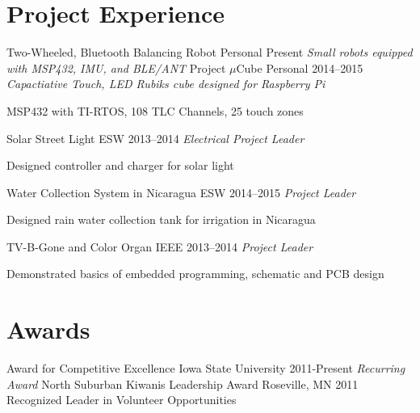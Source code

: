 \documentclass[]{friggeri-cv} %
\begin{document}
\section{Project Experience}
\begin{entrylist}
\entry
{Two-Wheeled, Bluetooth Balancing Robot}
{Personal}
{Present}
{\emph{Small robots equipped with MSP432, IMU, and BLE/ANT}}
{}
\entry
{Project \textbf{$\mu$}Cube}
{Personal}
{2014--2015}
{\emph{Capactiative Touch, LED Rubiks cube designed for Raspberry Pi}}
{\begin{itemizenosep}
	\item MSP432 with TI-RTOS, 108 TLC Channels, 25 touch zones
\end{itemizenosep}}
\entry
{Solar Street Light}
{ESW}
{2013--2014}
{\emph{Electrical Project Leader}}
{\begin{itemizenosep}
	\item Designed controller and charger for solar light
\end{itemizenosep}}
\entry
{Water Collection System in Nicaragua}
{ESW}
{2014--2015}
{\emph{Project Leader}}
{\begin{itemizenosep}
	\item Designed rain water collection tank for irrigation in Nicaragua
\end{itemizenosep}}
\vspace{-8pt}
\entry
{TV-B-Gone and Color Organ}
{IEEE}
{2013--2014}
{\emph{Project Leader}}
{\begin{itemizenosep}
	\item Demonstrated basics of embedded programming, schematic and PCB design
\end{itemizenosep}}
\end{entrylist}
\vspace{-8pt}
\section{Awards}
\begin{entrylist}
\entryFourItem
{Award for Competitive Excellence}
{Iowa State University}
{2011-Present}
{\emph{Recurring Award}}
\entryFourItem
{North Suburban Kiwanis Leadership Award}
{Roseville, MN}
{2011}
{Recognized Leader in Volunteer Opportunities}
\end{entrylist}
\end{document}
